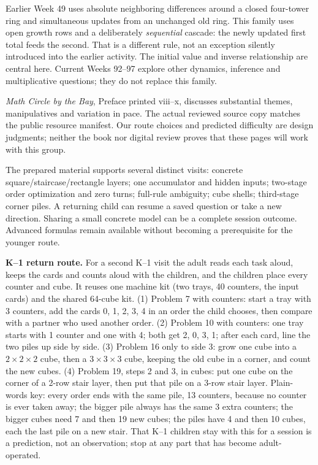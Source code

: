 \documentclass[11pt]{article}
\begin{document}
Earlier Week 49 uses absolute neighboring differences around a closed four-tower ring and simultaneous updates from an unchanged old ring. This family uses open growth rows and a deliberately \emph{sequential} cascade: the newly updated first total feeds the second. That is a different rule, not an exception silently introduced into the earlier activity. The initial value and inverse relationship are central here. Current Weeks 92--97 explore other dynamics, inference and multiplicative questions; they do not replace this family.

\emph{Math Circle by the Bay}, Preface printed viii--x, discusses substantial themes, manipulatives and variation in pace. The actual reviewed source copy matches the public resource manifest. Our route choices and predicted difficulty are design judgments; neither the book nor digital review proves that these pages will work with this group.

The prepared material supports several distinct visits: concrete square/staircase/rectangle layers; one accumulator and hidden inputs; two-stage order optimization and zero turns; full-rule ambiguity; cube shells; third-stage corner piles. A returning child can resume a saved question or take a new direction. Sharing a small concrete model can be a complete session outcome. Advanced formulas remain available without becoming a prerequisite for the younger route.

\textbf{K--1 return route.} For a second K--1 visit the adult reads each task aloud, keeps the cards and counts aloud with the children, and the children place every counter and cube. It reuses one machine kit (two trays, 40 counters, the input cards) and the shared 64-cube kit. (1) Problem 7 with counters: start a tray with 3 counters, add the cards 0, 1, 2, 3, 4 in an order the child chooses, then compare with a partner who used another order. (2) Problem 10 with counters: one tray starts with 1 counter and one with 4; both get 2, 0, 3, 1; after each card, line the two piles up side by side. (3) Problem 16 only to side 3: grow one cube into a $2\times2\times2$ cube, then a $3\times3\times3$ cube, keeping the old cube in a corner, and count the new cubes. (4) Problem 19, steps 2 and 3, in cubes: put one cube on the corner of a 2-row stair layer, then put that pile on a 3-row stair layer. Plain-words key: every order ends with the same pile, 13 counters, because no counter is ever taken away; the bigger pile always has the same 3 extra counters; the bigger cubes need 7 and then 19 new cubes; the piles have 4 and then 10 cubes, each the last pile on a new stair. That K--1 children stay with this for a session is a prediction, not an observation; stop at any part that has become adult-operated.
\end{document}
